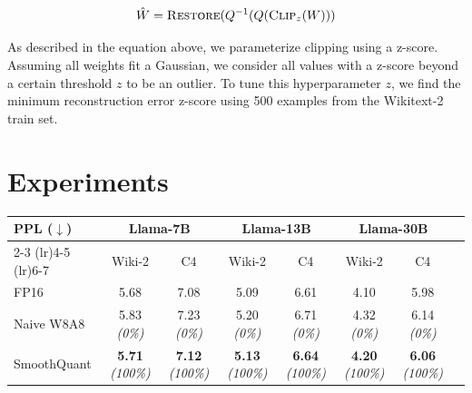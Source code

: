 \documentclass{article} %
\begin{document}
\begin{equation}
    \hat{W} = \textsc{Restore}(Q^{-1}(Q(\textsc{Clip}_z(W)))
\end{equation}

As described in the equation above, we parameterize clipping using a z-score. Assuming all weights fit a Gaussian, we consider all values with a z-score beyond a certain threshold $z$ to be an outlier. To tune this hyperparameter $z$, we find the minimum reconstruction error z-score using 500 examples from the Wikitext-2 train set.

\section{Experiments}

\begin{table}[t]
    \centering
    \small
    \begin{tabular}{l ccccccc}
        \toprule
        \textbf{PPL ($\downarrow$)} & \multicolumn{2}{c}{Llama-7B} & \multicolumn{2}{c}{Llama-13B} & \multicolumn{2}{c}{Llama-30B} \\
        \cmidrule(lr){2-3} \cmidrule(lr){4-5} \cmidrule(lr){6-7}
         & Wiki-2 & C4 & Wiki-2 & C4 & Wiki-2 & C4 \\
        \midrule
        FP16 & 5.68 & 7.08 & 5.09 & 6.61 & 4.10 & 5.98 \\
        \midrule
        Naive W8A8 & 5.83 \textit{\scriptsize(0\%)\hspace{5pt}} & 7.23 \textit{\scriptsize(0\%)\hspace{5pt}} & 5.20 \textit{\scriptsize(0\%)\hspace{5pt}} & 6.71 \textit{\scriptsize(0\%)\hspace{5pt}} & 4.32 \textit{\scriptsize(0\%)\hspace{5pt}} & 6.14 \textit{\scriptsize(0\%)\hspace{5pt}} \\
        SmoothQuant & \textbf{5.71} \textit{\scriptsize(100\%)\hspace{-1pt}} & \textbf{7.12} \textit{\scriptsize(100\%)\hspace{-1pt}} & \textbf{5.13} \textit{\scriptsize(100\%)\hspace{-1pt}} & \textbf{6.64} \textit{\scriptsize(100\%)\hspace{-1pt}} & \textbf{4.20} \textit{\scriptsize(100\%)\hspace{-1pt}} & \textbf{6.06} \textit{\scriptsize(100\%)\hspace{-1pt}} \\

\end{tabular}
\end{table}
\end{document}
